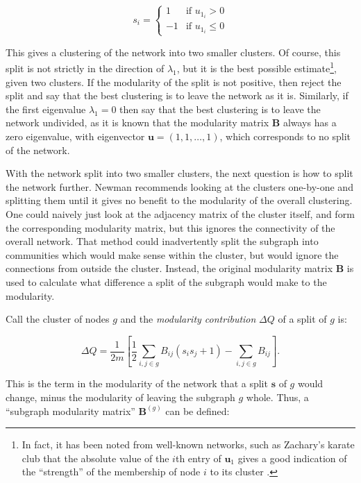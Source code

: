 \begin{equation}
s_i =\left\{ \begin{array}{ll} 1 & \mbox{if } u_{1_i}>0 \\
-1 & \mbox{if } u_{1_i}\leq0 \end{array} \right.
\end{equation}

This gives a clustering of the network into two smaller clusters. Of course, 
this split is not strictly in the direction of $\lambda_1$, but it is the best 
possible estimate\footnote{In fact, it has been noted from well-known networks, 
such as Zachary's karate club \citep{Zachary1977a} that the absolute value of 
the $i$th entry of $\mathbf{u}_1$ gives a good indication of the ``strength'' 
of the membership of node $i$ to its cluster \citep{Newman2006a}.}, given two 
clusters. If the modularity of the split is not positive, then reject the 
split and say that the best clustering is to leave the network as it is.  
Similarly, if the first eigenvalue $\lambda_1 = 0$ then say that the best 
clustering is to leave the network undivided, as it is known that the modularity 
matrix $\mathbf{B}$ always has a zero eigenvalue, with eigenvector 
$\mathbf{u} = ( 1,1, \ldots, 1)$, which corresponds to no split of the network.

With the network split into two smaller clusters, the next
question is how to split the network further.  Newman \citep{Newman2006a} recommends looking at the clusters
one-by-one and splitting them until it gives no benefit to the modularity
of the overall clustering.  One could naively just look at the
adjacency matrix of the cluster itself, and form the 
corresponding modularity matrix, but this ignores the connectivity of the
overall network.  That method could inadvertently split the subgraph into communities 
which would make sense within the cluster, but would ignore the connections 
from outside the cluster. Instead, the original modularity 
matrix $\mathbf{B}$ is used to calculate what difference a split of the subgraph would 
make to the modularity.

Call the cluster of nodes $g$ and the \emph{modularity contribution} $\Delta Q$ of a 
split of $g$ is:

\begin{equation}
\Delta Q  =  \frac{1}{2m} \left[ \frac{1}{2}\sum_{i,j\in g}B_{ij}(s_is_j + 1) - \sum_{i,j \in g} B_{ij} \right].
\end{equation}

This is the term in the modularity of the network that a split $\mathbf{s}$ of 
$g$ would change, minus the modularity of leaving the subgraph $g$ whole.  Thus, a ``subgraph modularity matrix'' $\mathbf{B}^{(g)}$ can be defined:

